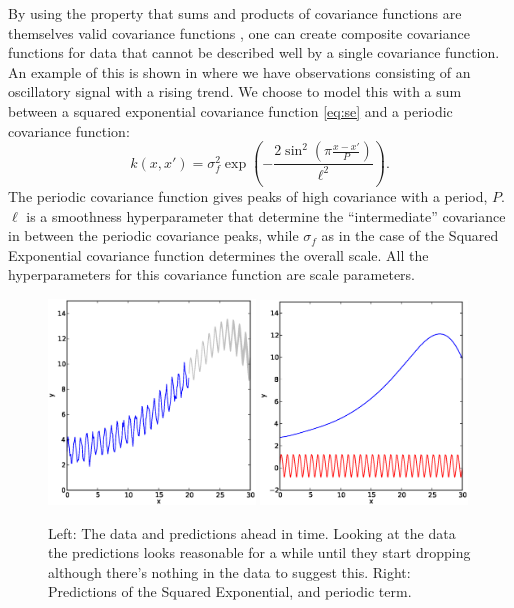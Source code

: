\documentclass[a4paper,11pt,article,oneside]{memoir}
\begin{document}
By using the property that sums and products of covariance functions are themselves valid covariance functions \cite[Chapter~4]{rasmussen2006}, one can create composite covariance functions for data that cannot be described well by a single covariance function. An example of this is shown in  where we have observations consisting of an oscillatory signal with a rising trend. We choose to model this with a sum between a squared exponential covariance function \eqref{eq:se} and a periodic covariance function:
%
\begin{equation}
k(x,x') =  \sigma_f^2 \exp \left(- \frac{2\sin^2 \left( \pi \frac{x-x'}{P} \right)}{\ell^2} \right).
\label{eq:per}
\end{equation}
%
The periodic covariance function gives peaks of high covariance with a period, $P$. $\ell$ is a smoothness hyperparameter that determine the ``intermediate'' covariance in between the periodic covariance peaks, while $\sigma_f$ as in the case of the Squared Exponential covariance function determines the overall scale. All the hyperparameters for this covariance function are scale parameters.

\begin{figure}[htb]
\centering
\includegraphics[width=0.49\textwidth]{fig9} \includegraphics[width=0.49\textwidth]{fig10}
\caption{Left: The data and predictions ahead in time. Looking at the data the predictions looks reasonable for a while until they start dropping although there's nothing in the data to suggest this. Right: Predictions of the Squared Exponential, and periodic term.}
\label{fig:composite}
\end{figure}
\end{document}
